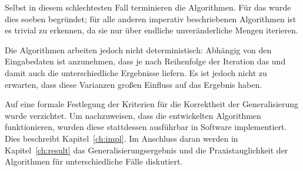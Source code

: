\documentclass[../main/thesis.tex]{subfiles}
\begin{document}
Selbst in diesem schlechtesten Fall terminieren die Algorithmen.
Für das  wurde dies soeben begründet; für alle anderen imperativ beschriebenen Algorithmen ist es trivial zu erkennen, da sie nur über endliche unveränderliche Mengen iterieren.

Die Algorithmen arbeiten jedoch nicht deterministisch:
Abhängig von den Eingabedaten ist anzunehmen, dass je nach Reihenfolge der Iteration das  und damit auch die  unterschiedliche Ergebnisse liefern.
Es ist jedoch nicht zu erwarten, dass diese Varianzen großen Einfluss auf das Ergebnis haben.

Auf eine formale Festlegung der Kriterien für die Korrektheit der Generalisierung wurde verzichtet.
Um nachzuweisen, dass die entwickelten Algorithmen funktionieren, wurden diese stattdessen ausführbar in Software implementiert.
Dies beschreibt Kapitel~\ref{ch:impl}.
Im Anschluss daran werden in Kapitel~\ref{ch:result} das Generalisierungsergebnis und die Praxistauglichkeit der Algorithmen für unterschiedliche Fälle diskutiert.



\end{document}
